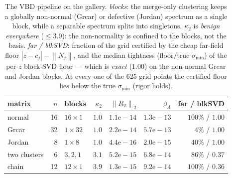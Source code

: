 \documentclass[11pt,a4paper]{article}
\newcommand{\norm}[1]{\left\|#1\right\|}
\newcommand{\abs}[1]{\left|#1\right|}
\theoremstyle{plain}
\theoremstyle{definition}
\begin{document}
\begin{table}[h]\centering
\begin{tabular}{lrlrrrr}
\toprule
matrix & $n$ & blocks & $\kappa_2$ & $\norm{R_2}_2$ & $\beta_\Lambda$ & far / blkSVD \\
\midrule
normal       & 16 & $16{\times}1$ & $1.0$ & $1.1\mathrm{e}{-}14$ & $1.3\mathrm{e}{-}13$ & $100\%$ / $1.00$ \\
Grcar        & 32 & $1{\times}32$ & $1.0$ & $2.2\mathrm{e}{-}14$ & $5.7\mathrm{e}{-}13$ & $4\%$ / $1.00$ \\
Jordan       &  8 & $1{\times}8$  & $1.0$ & $4.4\mathrm{e}{-}16$ & $2.0\mathrm{e}{-}15$ & $40\%$ / $1.00$ \\
two clusters &  6 & $3,2,1$       & $3.1$ & $5.2\mathrm{e}{-}15$ & $6.8\mathrm{e}{-}14$ & $86\%$ / $0.37$ \\
chain        & 12 & $12{\times}1$ & $3.9$ & $1.3\mathrm{e}{-}15$ & $9.2\mathrm{e}{-}14$ & $100\%$ / $0.36$ \\
\bottomrule
\end{tabular}
\caption{The VBD pipeline on the gallery. \emph{blocks}: the merge-only clustering keeps a
globally non-normal (Grcar) or defective (Jordan) spectrum as a single block, while a
separable spectrum splits into singletons. $\kappa_2$ is \emph{benign everywhere}
($\le3.9$): the non-normality is confined to the blocks, not the basis. \emph{far / blkSVD}:
fraction of the grid certified by the cheap far-field floor $\abs{z-c_j}-\norm{N_j}$, and
the median tightness (floor$/$true $\sigma_{\min}$) of the per-$z$ block-SVD floor --- which
is \emph{exact} ($1.00$) on the non-normal Grcar and Jordan blocks. At every one of the
$625$ grid points the certified floor lies below the true $\sigma_{\min}$ (rigor holds).}
\label{tab:gallery}
\end{table}
\end{document}
